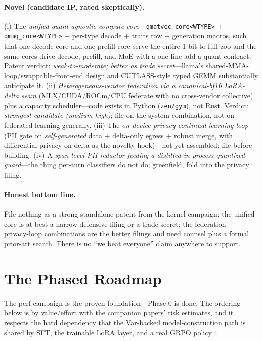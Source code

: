 \documentclass[11pt]{article}
\begin{document}
\paragraph{Novel (candidate IP, rated skeptically).} (i) The \emph{unified quant-agnostic compute core}---\texttt{qmatvec\_core<WTYPE>} $+$ \texttt{qmmq\_core<WTYPE>} $+$ per-type decode $+$ traits row $+$ generation macros, such that one decode core and one prefill core serve the entire 1-bit-to-full zoo and the same cores drive decode, prefill, and MoE with a one-line add-a-quant contract. Patent verdict: \emph{weak-to-moderate; better as trade secret}---llama's shared-MMA-loop/swappable-front-end design and CUTLASS-style typed GEMM substantially anticipate it. (ii) \emph{Heterogeneous-vendor federation via a canonical-bf16 LoRA-delta seam} (MLX/CUDA/ROCm/CPU federate with no cross-vendor collective) plus a capacity scheduler---code exists in Python (\texttt{zen/gym}), not Rust. Verdict: \emph{strongest candidate (medium-high)}; file on the system combination, not on federated learning generally. (iii) The \emph{on-device privacy continual-learning loop} (PII gate on \emph{self-generated} data $+$ delta-only egress $+$ robust merge, with differential-privacy-on-delta as the novelty hook)---not yet assembled; file before building. (iv) A \emph{span-level PII redactor feeding a distilled in-process quantized guard}---the thing per-turn classifiers do not do; greenfield, fold into the privacy filing.

\paragraph{Honest bottom line.} File nothing as a strong standalone patent from the kernel campaign; the unified core is at best a narrow defensive filing or a trade secret; the federation $+$ privacy-loop combinations are the better filings and need counsel plus a formal prior-art search. There is no ``we beat everyone'' claim anywhere to support.

\section{The Phased Roadmap}
\label{sec:roadmap}

The perf campaign is the proven foundation---Phase 0 is done. The ordering below is by value/effort with the companion papers' risk estimates, and it respects the hard dependency that the Var-backed model-construction path is shared by SFT, the trainable LoRA layer, and a real GRPO policy~\cite{hanzo-train}.
\end{document}
